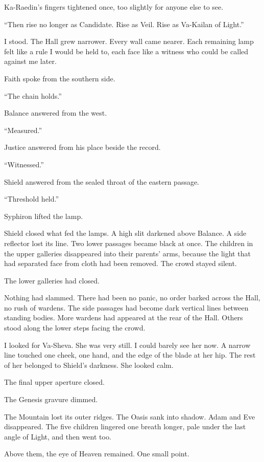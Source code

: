 Ka-Raedin's fingers tightened once, too slightly for anyone else to see.\par
``Then rise no longer as Candidate.
Rise as Veil.
Rise as Va-Kailan of Light.''\par
I stood.
The Hall grew narrower.
Every wall came nearer.
Each remaining lamp felt like a rule I would be held to, each face like a witness who could be called against me later.\par
Faith spoke from the southern side.\par
``The chain holds.''\par
Balance answered from the west.\par
``Measured.''\par
Justice answered from his place beside the record.\par
``Witnessed.''\par
Shield answered from the sealed throat of the eastern passage.\par
``Threshold held.''\par
Syphiron lifted the lamp.\par
Shield closed what fed the lamps.
A high slit darkened above Balance.
A side reflector lost its line.
Two lower passages became black at once.
The children in the upper galleries disappeared into their parents' arms, because the light that had separated face from cloth had been removed.
The crowd stayed silent.\par
The lower galleries had closed.\par
Nothing had slammed.
There had been no panic, no order barked across the Hall, no rush of wardens.
The side passages had become dark vertical lines between standing bodies.
More wardens had appeared at the rear of the Hall.
Others stood along the lower steps facing the crowd.\par
I looked for Va-Sheva.
She was very still.
I could barely see her now.
A narrow line touched one cheek, one hand, and the edge of the blade at her hip.
The rest of her belonged to Shield's darkness.
She looked calm.\par
The final upper aperture closed.\par
The Genesis gravure dimmed.\par
The Mountain lost its outer ridges.
The Oasis sank into shadow.
Adam and Eve disappeared.
The five children lingered one breath longer, pale under the last angle of Light, and then went too.\par
Above them, the eye of Heaven remained.
One small point.
